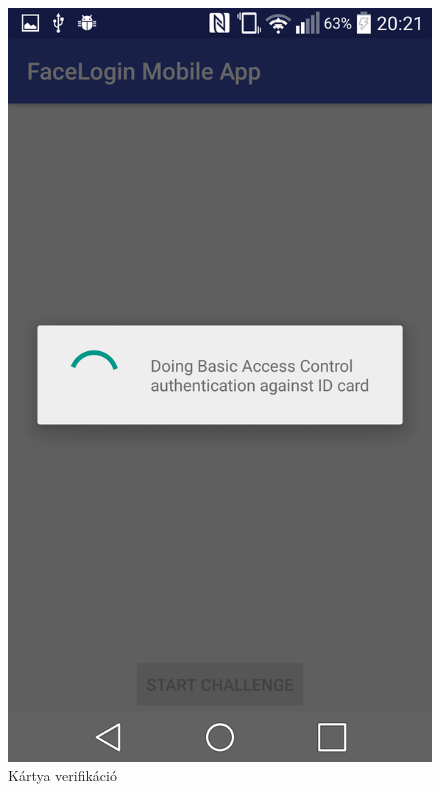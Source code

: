 \begin{figure}[h]
 \begin{minipage}{.30\textwidth} 
\centering
    \includegraphics[scale=0.10]{img/BAC}
    \caption{Kártya verifikáció}
 \end{minipage}
 \begin{minipage}{.30\textwidth} 
\centering

\end{minipage}
\end{figure}
